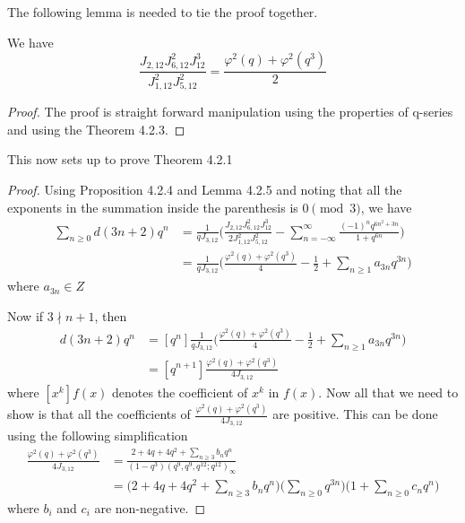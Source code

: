 The following lemma is needed to tie the proof together.
\begin{lemma}
We have
\begin{equation}
    \frac{J_{2,12}J_{6,12}^2J_{12}^3}{J_{1,12}^2J_{5,12}^2} = \frac{\varphi^2(q) + \varphi^2(q^3)}{2}
\end{equation}
\end{lemma}
\begin{proof}
The proof is straight forward manipulation using the properties of q-series and using the Theorem 4.2.3.
\end{proof}
This now sets up to prove Theorem 4.2.1
\begin{proof}
Using Proposition 4.2.4 and Lemma 4.2.5 and noting that all the exponents in the summation inside the parenthesis is $0 \pmod{3}$, we have
\begin{equation}
    \begin{split}
        \sum_{n \geq 0} d(3n+2)q^n  
        &= \frac{ 1 }{ q J_{3,12} } \bigg(\frac{ J_{2,12}J_{6,12}^2J_{12}^3 }{ 2J_{1,12}^2J_{5,12}^2 } - \sum_{n = -\infty}^\infty \frac{(-1)^n q^{6n^2+3n} }{1+q^{6n} }\bigg)
        \\&=\frac{1}{q J_{3,12} } \bigg(\frac{\varphi^2(q) + \varphi^2(q^3)}{4} - \frac{1}{2} + \sum_{n\geq 1}a_{3n}q^{3n}  \bigg)
    \end{split}
\end{equation}
where $a_{3n} \in Z$

Now if $3\nmid n+1$, then
\begin{equation}
    \begin{split}
        d(3n+2)q^n &=[q^n]\frac{1}{q J_{3,12} } \bigg(\frac{\varphi^2(q) + \varphi^2(q^3)}{4} - \frac{1}{2} + \sum_{n\geq 1}a_{3n}q^{3n}  \bigg)
        \\&=[q^{n+1}]\frac{\varphi^2(q) + \varphi^2(q^3)}{4J_{3,12}}
    \end{split}
\end{equation}
where $[x^k]f(x)$ denotes the coefficient of $x^k$ in $f(x)$. Now all that we need to show is that all the coefficients of $\frac{\varphi^2(q) + \varphi^2(q^3)}{4J_{3,12}}$ are positive. This can be done using the following simplification
\begin{equation*}
    \begin{split}
        \frac{\varphi^2(q) + \varphi^2(q^3)}{4J_{3,12}} &= 
        \frac{2+4q+4q^2 + \sum_{n\geq 3}b_nq^n   }{(1-q^3)(q^9,q^9,q^12;q^12)_\infty}
        \\&= \bigg( 2+4q+4q^2 + \sum_{n\geq 3}b_nq^n \bigg) \bigg(\sum_{n\geq0}q^{3n}\bigg)\bigg(1+\sum_{n\geq0}c_nq^n\bigg)
    \end{split}
\end{equation*}
where $b_i$ and $c_i$ are non-negative.
\end{proof}
